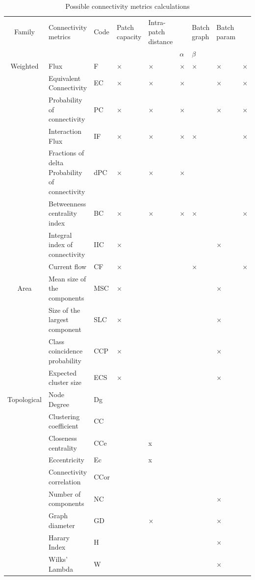 \documentclass{article}
\begin{document}
\begin{table}[H]
\begin{tabular}{|c|p{5cm}|l|>{\centering\arraybackslash}m{1.5cm}|>{\centering\arraybackslash}m{1.5cm}|>{\centering\arraybackslash}m{0.8cm}|>{\centering\arraybackslash}m{0.8cm}|>{\centering\arraybackslash}m{1cm}|>{\centering\arraybackslash}m{1cm}|}
\hline
Family & Connectivity metrics & Code & Patch capacity & Intra-patch distance  & \multicolumn{2}{m{1.8cm}|}{\centering Parameters} & Batch graph & Batch param\\
\hhline{~~~~~--~~}
 & & & & & $\alpha$ & $\beta$ & & \\
\hline
Weighted
 & Flux & F & × & × & × & × & × & ×\\
 & Equivalent Connectivity & EC & × & × & × & & × & ×\\
 & Probability of connectivity & PC & × & × & × & & × & ×\\
 & Interaction Flux  & IF & × & × & × & × &  & ×\\
 & Fractions of delta Probability of connectivity & dPC & × & × & × &  &  &\\
 & Betweenness centrality index & BC & × & × & × & × &  &×\\
 & Integral index of connectivity & IIC & × &  &  &  & × & \\
 & Current flow & CF & × &  &  & × &  & ×\\
\hline
Area
 & Mean size of the components & MSC & × &  &  &  & × & \\
 & Size of the largest component & SLC & × &  &  &  & × & \\
 & Class coincidence probability & CCP & × &  &  &  & × & \\
 & Expected cluster size & ECS & × &  &  &  & × & \\
\hline
Topological
 & Node Degree & Dg &  &  &  &  &  & \\
 & Clustering coefficient  & CC &  &  &  &  &  & \\
 & Closeness centrality & CCe &   & x &  &  &  & \\
 & Eccentricity & Ec &  & x &  &  &  & \\
 & Connectivity correlation & CCor &  &  &  &  &  & \\
 & Number of components & NC &  &  &  &  & × & \\
 & Graph diameter & GD &  & × &  &  & × & \\
 & Harary Index & H &  &  &  &  & × & \\
 & Wilks' Lambda & W &  &  &  &  & × & \\
\hline
\end{tabular}
\caption{Possible connectivity metrics calculations}
\label{metric_poss}
\end{table}
\end{document}
